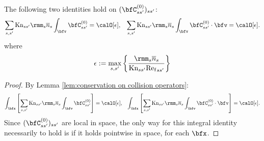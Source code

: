     \begin{lemma}\label{lem:conservation on local collision operators}
        The following two identities hold on $(\bfC_{ss'}^{(0)})_{ss'}$:
        \begin{align}
            \sum_{s, s'}\rmKn_{ss'}\rmm_{s}\overline{n}_{s}\int_{\bfv}\bfC_{ss'}^{(0)}           =  \calO[\epsilon],  &&
            \sum_{s, s'}\rmKn_{ss'}\rmm_{s}\overline{n}_{s}\int_{\bfv}\bfC_{ss'}^{(0)}\cdot\bfv  =  \calO[\epsilon].
        \end{align}
        where
        \begin{equation}
            \epsilon  :=  \max_{s, s'}\left\{\frac{\rmm_{s}\overline{n}_{s}}{\rmKn_{ss'}{\rmRef}_{ss'}}\right\}
        \end{equation}
    \end{lemma}
    \begin{proof}
        By Lemma \ref{lem:conservation on collision operators}:
        \begin{align}
            \int_{\bfx}\left[\sum_{s, s'}\rmKn_{ss'}\rmm_{s}\overline{n}_{s}\int_{\bfv}\bfC_{ss'}^{(0)}\right]           =  \calO[\epsilon],  &&
            \int_{\bfx}\left[\sum_{s, s'}\rmKn_{ss'}\rmm_{s}\overline{n}_{s}\int_{\bfv}\bfC_{ss'}^{(0)}\cdot\bfv\right]  =  \calO[\epsilon].
        \end{align}
        Since $(\bfC_{ss'}^{(0)})_{ss'}$ are local in space, the only way for this integral identity necessarily to hold is if it holds pointwise in space, for each $\bfx$.
    \end{proof}

